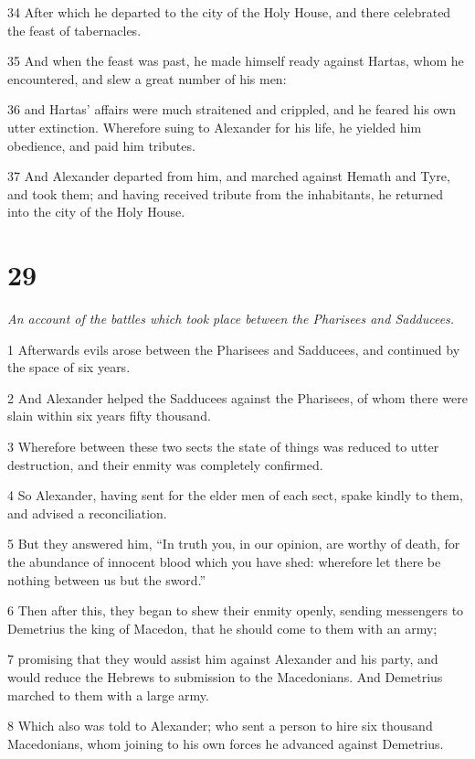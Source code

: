 34 After which he departed to the city of the Holy House, and there celebrated the feast of tabernacles. 

35 And when the feast was past, he made himself ready against Hartas, whom he encountered, and slew a great number of his men: 

36 and Hartas’ affairs were much straitened and crippled, and he feared his own utter extinction. Wherefore suing to Alexander for his life, he yielded him obedience, and paid him tributes. 

37 And Alexander departed from him, and marched against Hemath and Tyre, and took them; and having received tribute from the inhabitants, he returned into the city of the Holy House. 

\chapter{29}

\par \textit{An account of the battles which took place between the Pharisees and Sadducees.}

1 Afterwards evils arose between the Pharisees and Sadducees, and continued by the space of six years. 

2 And Alexander helped the Sadducees against the Pharisees, of whom there were slain within six years fifty thousand. 

3 Wherefore between these two sects the state of things was reduced to utter destruction, and their enmity was completely confirmed. 

4 So Alexander, having sent for the elder men of each sect, spake kindly to them, and advised a reconciliation. 

5 But they answered him, “In truth you, in our opinion, are worthy of death, for the abundance of innocent blood which you have shed: wherefore let there be nothing between us but the sword.” 

6 Then after this, they began to shew their enmity openly, sending messengers to Demetrius the king of Macedon, that he should come to them with an army; 

7 promising that they would assist him against Alexander and his party, and would reduce the Hebrews to submission to the Macedonians. And Demetrius marched to them with a large army.

8 Which also was told to Alexander; who sent a person to hire six thousand Macedonians, whom joining to his own forces he advanced against Demetrius. 


